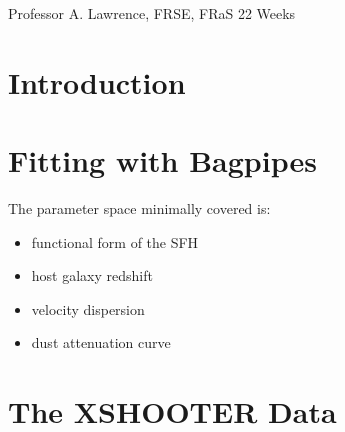 \documentclass[a4paper,11pt]{article}
\begin{document}
\vfill
{} Professor A. Lawrence, FRSE, FRaS
\hfill
22 Weeks

\newpage
\setcounter{page}{1} %
\tableofcontents

\newpage
\section{Introduction}\label{sec:introduction}

\section{Fitting with Bagpipes}\label{sec:fitting_with_bagpipes}

The parameter space minimally covered is:

\begin{itemize}
  \item functional form of the SFH
  \item host galaxy redshift
  \item velocity dispersion
  \item dust attenuation curve
\end{itemize}

\section{The XSHOOTER Data}
\end{document}
